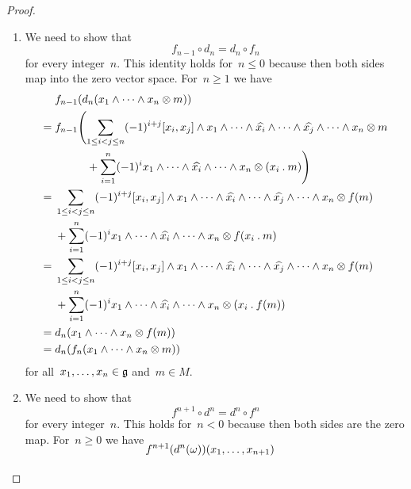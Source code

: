 \begin{proof}
	\leavevmode
	\begin{enumerate}
		\item
			We need to show that
			\[
				f_{n-1} \circ d_n
				=
				d_n \circ f_n
			\]
			for every integer~$n$.
			This identity holds for~$n \leq 0$ because then both sides map into the zero vector space.
			For~$n \geq 1$ we have
			\begin{align*}
				{}&
				f_{n-1}( d_n( x_1 \wedge \dotsb \wedge x_n \tensor m ) )
				\\
				={}&
				f_{n-1}
				\Biggl(
					\sum_{1 \leq i < j \leq n}
					(-1)^{i + j}
					[x_i, x_j] \wedge x_1 \wedge \dotsb \wedge \widehat{x_i} \wedge \dotsb \wedge \widehat{x_j} \wedge \dotsb \wedge x_n \tensor m
				\\
				{}&
					\phantom{
						f_{n-1}
						\Biggl(
					}
					+
					\sum_{i=1}^n
					(-1)^i
					x_1 \wedge \dotsb \wedge \widehat{x_i} \wedge \dotsb \wedge x_n \tensor (x_i \act m)
				\Biggr)
				\\
				={}&
				\sum_{1 \leq i < j \leq n}
				(-1)^{i + j}
				[x_i, x_j] \wedge x_1 \wedge \dotsb \wedge \widehat{x_i} \wedge \dotsb \wedge \widehat{x_j} \wedge \dotsb \wedge x_n \tensor f(m)
				\\
				{}&
				+
				\sum_{i=1}^n
				(-1)^i
				x_1 \wedge \dotsb \wedge \widehat{x_i} \wedge \dotsb \wedge x_n \tensor f(x_i \act m)
				\\
				={}&
				\sum_{1 \leq i < j \leq n}
				(-1)^{i + j}
				[x_i, x_j] \wedge x_1 \wedge \dotsb \wedge \widehat{x_i} \wedge \dotsb \wedge \widehat{x_j} \wedge \dotsb \wedge x_n \tensor f(m)
				\\
				{}&
				+
				\sum_{i=1}^n
				(-1)^i
				x_1 \wedge \dotsb \wedge \widehat{x_i} \wedge \dotsb \wedge x_n \tensor ( x_i \act f(m) )
				\\
				={}&
				d_n( x_1 \wedge \dotsb \wedge x_n \tensor f(m) )
				\\
				={}&
				d_n( f_n( x_1 \wedge \dotsb \wedge x_n \tensor m ) )
			\end{align*}
			for all~$x_1, \dotsc, x_n \in \mathfrak{g}$ and~$m \in M$.
		\item
			We need to show that
			\[
				f^{n+1} \circ d^n
				=
				d^n \circ f^n
			\]
			for every integer~$n$.
			This holds for~$n < 0$ because then both sides are the zero map.
			For~$n \geq 0$ we have
			\begingroup
			\allowdisplaybreaks
			\begin{align*}
				\SwapAboveDisplaySkip
				{}&
				f^{n+1}( d^n(\omega) )(x_1, \dotsc, x_{n+1})

\end{align*}
\end{enumerate}
\end{proof}
